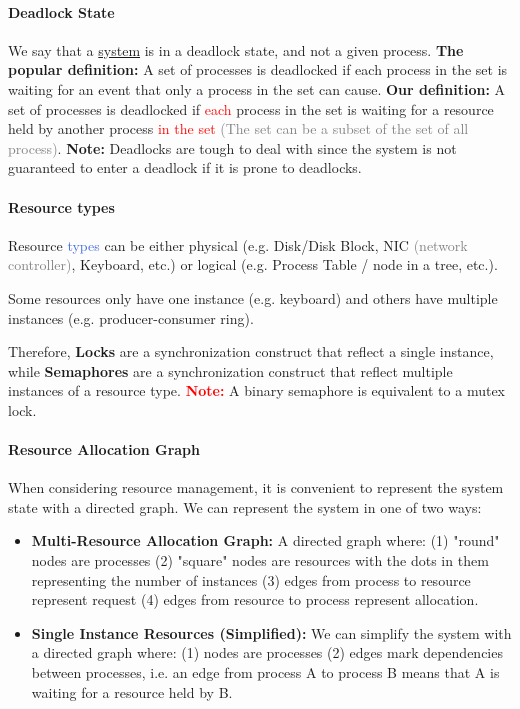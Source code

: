 \documentclass[openany,12pt]{book}
\newcommand{\red}[1]{\textcolor{Red}{#1}}
\newcommand{\blue}[1]{\textcolor{RoyalBlue}{#1}}
\newcommand{\gray}[1]{\textcolor{gray}{#1}}
\begin{document}
\paragraph{Deadlock State} We say that a \ul{system} is in a deadlock state, and not a given process. \textbf{The popular definition:} A set of processes is deadlocked if each process in the set is waiting for an event that only a process in the set can cause. \textbf{Our definition:} A set of processes is deadlocked if \red{each} process in the set is waiting for a resource held by another process \red{in the set} \gray{(The set can be a subset of the set of all process)}. \textbf{Note:} Deadlocks are tough to deal with since the system is not guaranteed to enter a deadlock if it is prone to deadlocks.

\paragraph{Resource types} Resource \blue{types} can be either physical (e.g. Disk/Disk Block, NIC \gray{(network controller)}, Keyboard, etc.) or logical (e.g. Process Table / node in a tree, etc.).

Some resources only have one instance (e.g. keyboard) and others have multiple instances (e.g. producer-consumer ring).

Therefore, \textbf{Locks} are a synchronization construct that reflect a single instance, while \textbf{Semaphores} are a synchronization construct that reflect multiple instances of a resource type. \red{\textbf{Note:}} A binary semaphore is equivalent to a mutex lock.

\paragraph{Resource Allocation Graph} When considering resource management, it is convenient to represent the system state with a directed graph. We can represent the system in one of two ways:
\begin{itemize}
  \item \textbf{Multi-Resource Allocation Graph:} A directed graph where: (1) "round" nodes are processes (2) "square" nodes are resources with the dots in them representing the number of instances (3) edges from process to resource represent request (4) edges from resource to process represent allocation.

  \item \textbf{Single Instance Resources (Simplified):} We can simplify the system with a directed graph where: (1) nodes are processes (2) edges mark dependencies between processes, i.e. an edge from process A to process B means that A is waiting for a resource held by B.

\end{itemize}
\end{document}
